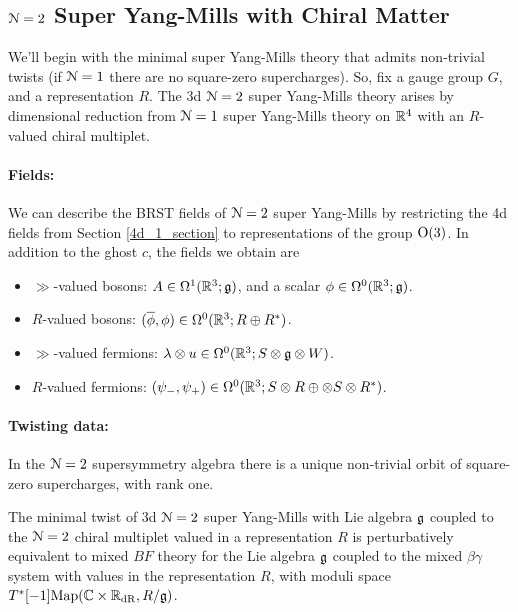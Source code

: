 \documentclass[10pt, oneside]{article}
\begin{document}
\subsection{\texorpdfstring{$\mathcal N = 2$}{N=2} Super Yang-Mills with Chiral Matter} \label{3d_2_section}
We'll begin with the minimal super Yang-Mills theory that admits non-trivial twists (if $\mathcal{N}=1$ there are no square-zero supercharges).  So, fix a gauge group $G$, and a representation $R$.  The 3d $\mathcal{N}=2$ super Yang-Mills theory arises by dimensional reduction from $\mathcal{N}=1$ super Yang-Mills theory on $\mathbb R^4$ with an $R$-valued chiral multiplet.

\vspace{-10pt}
\paragraph{Fields:} We can describe the BRST fields of $\mathcal{N}=2$ super Yang-Mills by restricting the 4d fields from Section \ref{4d_1_section} to representations of the group $\mathrm{O}(3)$.  In addition to the ghost $c$, the fields we obtain are
\begin{itemize}
 \item $\gg$-valued bosons: $A \in \Omega^1(\mathbb R^3; \mathfrak{g})$, and a scalar $\phi \in \Omega^0(\mathbb R^3; \mathfrak{g})$.
 \item $R$-valued bosons: $(\overline{\phi}, \phi) \in \Omega^0(\mathbb R^3 ; R \oplus R^*)$.
 \item $\gg$-valued fermions: $\lambda \otimes u \in \Omega^0(\mathbb R^3 ; S \otimes \mathfrak{g} \otimes W)$.
 \item $R$-valued fermions: $(\psi_-,\psi_+) \in \Omega^0(\mathbb R^3 ; S \otimes R \oplus \otimes S \otimes R^*)$.
\end{itemize}

\vspace{-10pt}
\paragraph{Twisting data:}
In the $\mathcal{N}=2$ supersymmetry algebra there is a unique non-trivial orbit of square-zero supercharges, with rank one. 

\begin{thm} \label{3d_minimal_twist_thm}
The minimal twist of 3d $\mathcal N=2$ super Yang-Mills with Lie algebra $\mathfrak g$ coupled to the $\mathcal N=2$ chiral multiplet valued in a representation $R$ is perturbatively equivalent to mixed $BF$ theory for the Lie algebra $\mathfrak g$ coupled to the mixed $\beta\gamma$ system with values in the representation $R$, with moduli space $T^*[-1]\mathrm{Map}(\mathbb C \times \mathbb R_{\mathrm{dR}}, R/\mathfrak{g})$. 
\end{thm}
\end{document}
